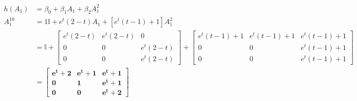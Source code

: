 \begin{align}
  h(A_1)   &= \beta_0 + \beta_1 A_1 + \beta_2 A_1^2 \nonumber \\
  A_1^{10} &= 1 \mathbb{I} + e^t (2 - t) A_1 + [e^t (t -1) + 1] A_1^2 \nonumber \\
           &= \mathbb{I}
              + \begin{bmatrix} 
                  e^t (2 - t) & e^t (2 - t) & 0 \\ 
                  0 & 0 & e^t (2 - t) \\
                  0 & 0 & e^t (2 - t)
                \end{bmatrix} \nonumber
              + \begin{bmatrix} 
                  e^t (t -1) + 1 & e^t (t -1) + 1 & e^t (t -1) + 1 \\ 
                  0 & 0 & e^t (t -1) + 1 \\
                  0 & 0 & e^t (t -1) + 1
                \end{bmatrix} \nonumber \\
           &= \mathbf{
           \begin{bmatrix} 
              e^t + 2 & e^t + 1 & e^t + 1 \\ 
              0 & 1 & e^t + 1 \\
              0 & 0 & e^t + 2
           \end{bmatrix}
           } \nonumber \\
\end{align}



